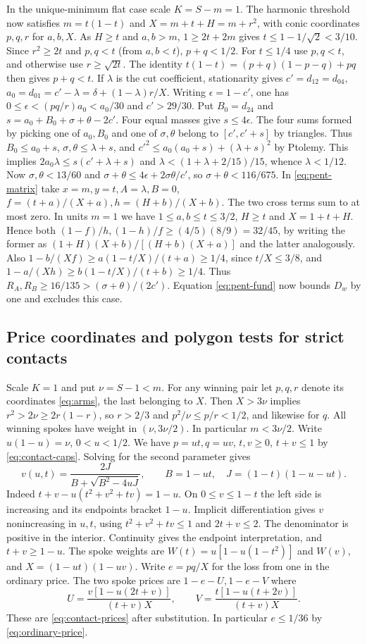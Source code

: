 \documentclass[11pt,a4paper]{article}
\theoremstyle{definition}
\begin{document}
In the unique-minimum flat case scale $K=S-m=1$. The harmonic threshold
now satisfies $m=t(1-t)$ and $X=m+t+H=m+r^2$, with conic coordinates
$p,q,r$ for $a,b,X$. As $H\ge t$ and $a,b>m$, $1\ge2t+2m$ gives
$t\le1-1/\sqrt2<3/10$. Since $r^2\ge2t$ and $p,q<t$
(from $a,b<t$), $p+q<1/2$. For $t\le1/4$ use $p,q<t$, and otherwise
use $r\ge\sqrt{2t}$. The identity
$t(1-t)=(p+q)(1-p-q)+pq$ then gives $p+q<t$.
If $\lambda$ is the cut coefficient, stationarity gives
$c'=d_{12}=d_{04}$, $a_0=d_{01}=c'-\lambda=\delta+(1-\lambda)r/X$.
Writing $\epsilon=1-c'$, one has
$0\le\epsilon<(pq/r)a_0<a_0/30$ and $c'>29/30$.
Put $B_0=d_{24}$ and $s=a_0+B_0+\sigma+\theta-2c'$.
Four equal masses give $s\le4\epsilon$. The four sums formed by picking
one of $a_0,B_0$ and one of $\sigma,\theta$ belong to $[c',c'+s]$
by triangles. Thus $B_0\le a_0+s$, $\sigma,\theta\le\lambda+s$, and
$c'^2\le a_0(a_0+s)+(\lambda+s)^2$ by Ptolemy. This implies
$2a_0\lambda\le s(c'+\lambda+s)$ and
$\lambda<(1+\lambda+2/15)/15$, whence $\lambda<1/12$.
Now $\sigma,\theta<13/60$ and
$\sigma+\theta\le4\epsilon+2\sigma\theta/c'$, so
$\sigma+\theta<116/675$. In \eqref{eq:pent-matrix} take
$x=m,y=t,A=\lambda,B=0$, $f=(t+a)/(X+a),h=(H+b)/(X+b)$.
The two cross terms sum to at most zero. In units $m=1$ we have
$1\le a,b\le t\le3/2$, $H\ge t$ and $X=1+t+H$. Hence both
$(1-f)/h,(1-h)/f\ge(4/5)(8/9)=32/45$, by writing the former as
$(1+H)(X+b)/[(H+b)(X+a)]$ and the latter analogously. Also
$1-b/(Xf)\ge a(1-t/X)/(t+a)\ge1/4$, since $t/X\le3/8$,
and $1-a/(Xh)\ge b(1-t/X)/(t+b)\ge1/4$.
Thus $R_A,R_B\ge16/135>(\sigma+\theta)/(2c')$. Equation
\eqref{eq:pent-fund} now bounds $D_w$ by one and excludes this case.

\subsection{Price coordinates and polygon tests for strict contacts}

Scale $K=1$ and put $\nu=S-1<m$. For any winning pair let $p,q,r$
denote its coordinates \eqref{eq:arms}, the last belonging to $X$.
Then $X>3\nu$ implies $r^2>2\nu\ge2r(1-r)$, so $r>2/3$ and
$p^2/\nu\le p/r<1/2$, and likewise for $q$. All winning spokes have
weight in $(\nu,3\nu/2)$. In particular $m<3\nu/2$. Write
$u(1-u)=\nu$, $0<u<1/2$. We have $p=ut,q=uv$, $t,v\ge0$,
$t+v\le1$ by \eqref{eq:contact-caps}. Solving for the second parameter gives
\[
 v(u,t)=\frac{2J}{B+\sqrt{B^2-4uJ}},\qquad
 B=1-ut,\quad J=(1-t)(1-u-ut).
\]
Indeed $t+v-u(t^2+v^2+tv)=1-u$. On $0\le v\le1-t$ the left side
is increasing and its endpoints bracket $1-u$. Implicit differentiation
gives $v$ nonincreasing in $u,t$, using $t^2+v^2+tv\le1$ and
$2t+v\le2$. The denominator is positive in the interior. Continuity gives
the endpoint interpretation, and $t+v\ge1-u$. The spoke weights are
$W(t)=u[1-u(1-t^2)]$ and $W(v)$, and $X=(1-ut)(1-uv)$.
Write $e=pq/X$ for the loss from one in the ordinary price. The two
spoke prices are $1-e-U,1-e-V$ where
\begin{equation}\label{eq:pent-pen}
 U=\frac{v[1-u(2t+v)]}{(t+v)X},\qquad
 V=\frac{t[1-u(t+2v)]}{(t+v)X}.
\end{equation}
These are \eqref{eq:contact-prices} after substitution. In particular
$e\le1/36$ by \eqref{eq:ordinary-price}.
\end{document}
